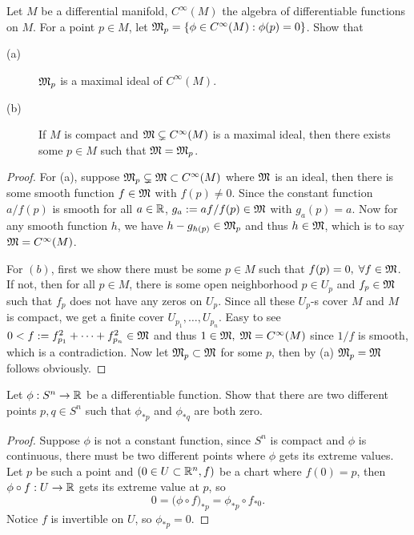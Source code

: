 \begin{pro}%
	Let $M$ be a differential manifold, $C^{\infty}(M)$ the algebra of differentiable functions on $M$. For a point $p\in M$, let $\mathfrak{M}_p=\{\phi\in C^{\infty}(M): \phi(p)=0\}$. Show that 
	\begin{description}
		\item[(a)] $\mathfrak{M}_p$ is a maximal ideal of $C^{\infty}(M)$.
		\item[(b)] If $M$ is compact and $\mathfrak{M}\subsetneq C^{\infty}(M)$ is a maximal ideal, then there exists some $p\in M$ such that $\mathfrak{M}=\mathfrak{M}_p$.
	\end{description}
\end{pro}
\begin{proof}
	For (a), suppose $\mathfrak{M}_p\subsetneq \mathfrak{M}\subset C^{\infty}(M)$ where $\mathfrak{M}$ is an ideal, then there is some smooth function $f\in \mathfrak{M}$ with $f(p)\neq 0$. Since the constant function $a/f(p)$ is smooth for all $a\in\mathbb{R}$, $g_a:=af/f(p)\in \mathfrak{M}$ with $g_a(p)=a$. Now for any smooth function $h$, we have $h-g_{h(p)}\in\mathfrak{M}_p$ and thus $h\in\mathfrak{M}$, which is to say $\mathfrak{M}=C^{\infty}(M)$.

	For $(b)$, first we show there must be some $p\in M$ such that $f(p)=0,\;\forall f\in\mathfrak{M}$. If not, then for all $p\in M$, there is some open neighborhood $p\in U_p$ and $f_p\in \mathfrak{M}$ such that $f_p$ does not have any zeros on $U_p$. Since all these $U_p$-s cover $M$ and $M$ is compact, we get a finite cover $U_{p_1},\dots,U_{p_n}$. Easy to see $0<f:=f_{p_1}^2+\dots +f_{p_n}^2\in \mathfrak{M}$ and thus $1\in \mathfrak{M},\; \mathfrak{M}=C^{\infty}(M)$ since $1/f$ is smooth, which is a contradiction. Now let $\mathfrak{M}_p\subset \mathfrak{M}$ for some $p$, then by (a) $\mathfrak{M}_p=\mathfrak{M}$ follows obviously.
\end{proof} 
\begin{pro}%
	Let $\phi:S^n\to\mathbb{R}$ be a differentiable function. Show that there are two different points $p,q\in S^n$ such that $\phi_{*p}$ and $\phi_{*q}$ are both zero.
\end{pro}
\begin{proof}
	Suppose $\phi$ is not a constant function, since $S^n$ is compact and $\phi$ is continuous, there must be two different points where $\phi$ gets its extreme values. Let $p$ be such a point and $(0\in U\subset \mathbb{R}^n,f)$ be a chart where $f(0)=p$, then $\phi\circ f:U\to \mathbb{R}$ gets its extreme value at $p$, so 
	\[0=\big(\phi\circ f\big)_{*p}=\phi_{*p}\circ f_{*0}.\]
	Notice $f$ is invertible on $U$, so $\phi_{*p}=0$.
\end{proof}
